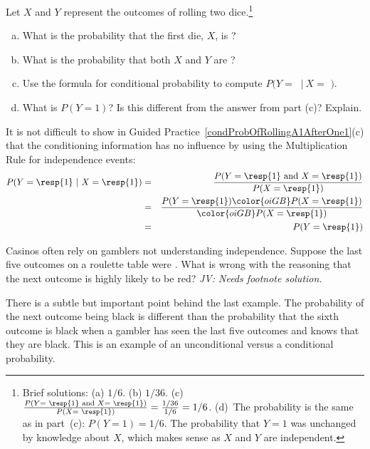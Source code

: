 \begin{exercise} \label{condProbOfRollingA1AfterOne1}
Let $X$ and $Y$ represent the outcomes of rolling two dice.\footnote{Brief solutions: (a) $1/6$. (b) $1/36$. (c)~$\frac{P(Y = \text{ \resp{1} and }X=\text{ \resp{1}})}{P(X=\text{ \resp{1}})} = \frac{1/36}{1/6} = 1/6$. (d)~The probability is the same as in part~(c): $P(Y=1)=1/6$. The probability that $Y=1$ was unchanged by knowledge about $X$, which makes sense as $X$ and $Y$ are independent.}
\begin{enumerate}[(a)]
\item What is the probability that the first die, $X$, is ?
\item What is the probability that both $X$ and $Y$ are ?
\item Use the formula for conditional probability to compute $P(Y =$ $\ |\ X = $ $)$.
\item What is $P(Y=1)$? Is this different from the answer from part (c)? Explain.
\end{enumerate}
\end{exercise}

It is not difficult to show in Guided Practice~\ref{condProbOfRollingA1AfterOne1}(c) that the conditioning information has no influence by using the Multiplication Rule for independence events:
\begin{eqnarray*}
P(Y=\text{\resp{1}}\ |\ X=\text{\resp{1}})
	&=& \frac{P(Y=\text{\resp{1} and }X=\text{\resp{1}})}{P(X=\text{\resp{1}})} \\
	&=& \frac{P(Y=\text{\resp{1}}) \color{oiGB}P(X=\text{\resp{1}})}{\color{oiGB}P(X=\text{\resp{1}})} \\
	&=& P(Y=\text{\resp{1}}) \\
\end{eqnarray*}



\begin{exercise}
Casinos often rely on gamblers not understanding independence.  Suppose the last five outcomes on a roulette table were .  What is wrong with the reasoning that the next outcome is highly likely to be red? \textit{JV: Needs footnote solution.}
\end{exercise}

There is a subtle but important point behind the last example.  The probability of the next outcome being black is different than the probability that the sixth outcome is black when a gambler has seen the last five outcomes and knows that they are black.  This is an example of an unconditional versus a conditional probability.

